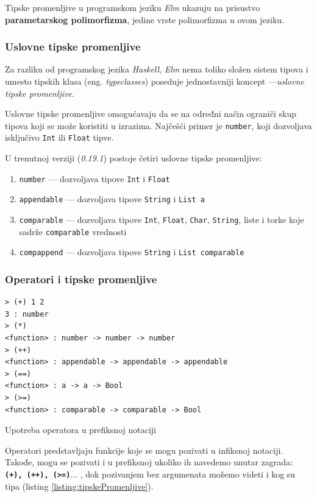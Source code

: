 \documentclass[12pt,oneside]{memoir}
\begin{document}
Tipske promenljive u programskom jeziku \emph{Elm} ukazuju na prisustvo \textbf{parametarskog polimorfizma},
jedine vrste polimorfizma u ovom jeziku.

\subsubsection{Uslovne tipske promenljive}
Za razliku od programskog jezika \emph{Haskell}, \emph{Elm} nema toliko složen sistem tipova i umesto tipskih 
klasa (eng. \emph{typeclasses})\cite{typeclasses} poseduje jednostavniji koncept
---\emph{uslovne tipske promenljive}. 

Uslovne tipske promenljive omogućavaju da se na određni način ograniči skup tipova
koji se može koristiti u izrazima. Najčešći primer je \texttt{number}, koji dozvoljava 
isključivo \texttt{Int} ili \texttt{Float} tipve. 

U trenutnoj verziji (\emph{0.19.1}) postoje četiri uslovne tipske promenljive:
\begin{enumerate}
  \item \texttt{number} --- dozvoljava tipove \texttt{Int} i \texttt{Float}
  \item \texttt{appendable} --- dozvoljava tipove \texttt{String} i \texttt{List a}
  \item \texttt{comparable} --- dozvoljava tipove \texttt{Int}, \texttt{Float}, \texttt{Char},
  \texttt{String}, liste i torke koje sadrže \texttt{comparable} vrednosti
  \item \texttt{compappend} --- dozvoljava tipove \texttt{String} i \texttt{List comparable}
\end{enumerate}
\subsubsection{Operatori i tipske promenljive}

\begin{listing}[h]
\begin{verbatim}
> (+) 1 2
3 : number
> (*)
<function> : number -> number -> number
> (++)
<function> : appendable -> appendable -> appendable
> (==)
<function> : a -> a -> Bool
> (>=)
<function> : comparable -> comparable -> Bool
\end{verbatim}
\caption{Upotreba operatora u prefiksnoj notaciji}
\label{listing:tipskePromenljive}
\end{listing}
Operatori predstavljaju funkcije koje se mogu pozivati u infiksnoj notaciji. Takođe, 
mogu se pozivati i u prefiksnoj ukoliko ih navedemo unutar zagrada: \texttt{\textbf{(+),
(++), (>=)}}... , dok pozivanjem bez argumenata možemo videti i kog su tipa (listing \ref{listing:tipskePromenljive}).
\end{document}
